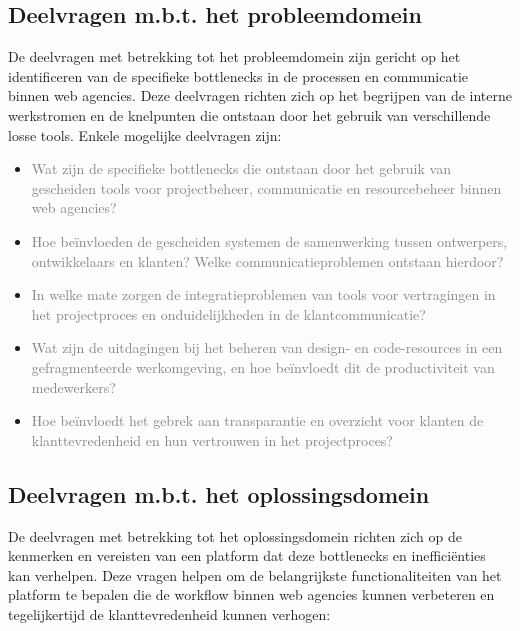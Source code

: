 \subsection{Deelvragen m.b.t. het probleemdomein}

De deelvragen met betrekking tot het probleemdomein zijn gericht op het identificeren van de specifieke bottlenecks in de processen en communicatie binnen web agencies. Deze deelvragen richten zich op het begrijpen van de interne werkstromen en de knelpunten die ontstaan door het gebruik van verschillende losse tools. Enkele mogelijke deelvragen zijn:

\begin{itemize}
    \item \textcolor{gray}{Wat zijn de specifieke bottlenecks die ontstaan door het gebruik van gescheiden tools voor projectbeheer, communicatie en resourcebeheer binnen web agencies?}
    \item \textcolor{gray}{Hoe beïnvloeden de gescheiden systemen de samenwerking tussen ontwerpers, ontwikkelaars en klanten? Welke communicatieproblemen ontstaan hierdoor?}
    \item \textcolor{gray}{In welke mate zorgen de integratieproblemen van tools voor vertragingen in het projectproces en onduidelijkheden in de klantcommunicatie?}
    \item \textcolor{gray}{Wat zijn de uitdagingen bij het beheren van design- en code-resources in een gefragmenteerde werkomgeving, en hoe beïnvloedt dit de productiviteit van medewerkers?}
    \item \textcolor{gray}{Hoe beïnvloedt het gebrek aan transparantie en overzicht voor klanten de klanttevredenheid en hun vertrouwen in het projectproces?}
\end{itemize}

\subsection{Deelvragen m.b.t. het oplossingsdomein}

De deelvragen met betrekking tot het oplossingsdomein richten zich op de kenmerken en vereisten van een platform dat deze bottlenecks en inefficiënties kan verhelpen. Deze vragen helpen om de belangrijkste functionaliteiten van het platform te bepalen die de workflow binnen web agencies kunnen verbeteren en tegelijkertijd de klanttevredenheid kunnen verhogen:

